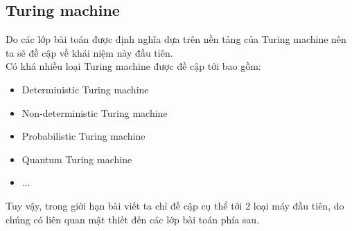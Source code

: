 \documentclass[a4paper 14pt]{article}
\begin{document}
		\subsection{Turing machine}
			Do các lớp bài toán được định nghĩa dựa trên nền tảng của Turing machine nên ta sẽ đề cập về khái niệm này đầu tiên.\\
			Có khá nhiều loại Turing machine được đề cập tới bao gồm:\\
			\begin{itemize}
				\item Deterministic Turing machine
				\item Non-deterministic Turing machine
				\item Probabilistic Turing machine
				\item Quantum Turing machine
				\item $\hdots$
			\end{itemize}
			Tuy vậy, trong giới hạn bài viết ta chỉ đề cập cụ thể tới 2 loại máy đầu tiên, do chúng có liên quan mật thiết đến các lớp bài toán phía sau.
\end{document}
